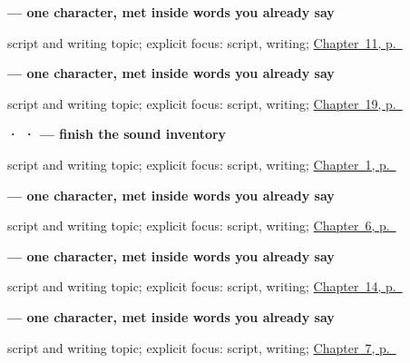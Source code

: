 \noindent\begin{minipage}[t]{\linewidth}
\raggedright
\textbf{ — one character, met inside words you already say}\par
\footnotesize script and writing topic; explicit focus: script, writing; \hyperref[ch:ml-core-colours]{Chapter~11, p.~\pageref*{ch:ml-core-colours}}
\end{minipage}\par\smallskip

\noindent\begin{minipage}[t]{\linewidth}
\raggedright
\textbf{ — one character, met inside words you already say}\par
\footnotesize script and writing topic; explicit focus: script, writing; \hyperref[ch:ml-asking-age]{Chapter~19, p.~\pageref*{ch:ml-asking-age}}
\end{minipage}\par\smallskip

\noindent\begin{minipage}[t]{\linewidth}
\raggedright
\textbf{ ·  ·  — finish the sound inventory}\par
\footnotesize script and writing topic; explicit focus: script, writing; \hyperref[ch:greetings]{Chapter~1, p.~\pageref*{ch:greetings}}
\end{minipage}\par\smallskip

\noindent\begin{minipage}[t]{\linewidth}
\raggedright
\textbf{ — one character, met inside words you already say}\par
\footnotesize script and writing topic; explicit focus: script, writing; \hyperref[ch:ml-dative-case]{Chapter~6, p.~\pageref*{ch:ml-dative-case}}
\end{minipage}\par\smallskip

\noindent\begin{minipage}[t]{\linewidth}
\raggedright
\textbf{ — one character, met inside words you already say}\par
\footnotesize script and writing topic; explicit focus: script, writing; \hyperref[ch:ml-seasons]{Chapter~14, p.~\pageref*{ch:ml-seasons}}
\end{minipage}\par\smallskip

\noindent\begin{minipage}[t]{\linewidth}
\raggedright
\textbf{ — one character, met inside words you already say}\par
\footnotesize script and writing topic; explicit focus: script, writing; \hyperref[ch:ml-numbers-one-to-ten]{Chapter~7, p.~\pageref*{ch:ml-numbers-one-to-ten}}
\end{minipage}\par\smallskip

